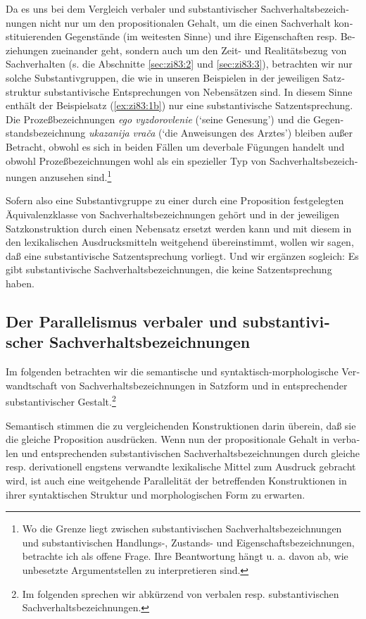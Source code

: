 \documentclass[output=paper]{langscibook}
\begin{document}
\begin{otherlanguage}{german}
Da es uns bei dem Vergleich verbaler und substantivischer Sachverhaltsbezeichnungen nicht nur um den propositionalen Gehalt, um die einen Sachverhalt konstituierenden Gegenstände (im weitesten Sinne) und ihre Eigenschaften resp. Beziehungen zueinander geht, sondern auch um den Zeit- und Realitätsbezug von Sachverhalten (s. die Abschnitte \ref{sec:zi83:2} und \ref{sec:zi83:3}), betrachten wir nur solche Substantivgruppen, die wie in unseren Beispielen in der jeweiligen Satzstruktur substantivische Entsprechungen von Nebensätzen sind. In diesem Sinne enthält der Beispielsatz (\ref{ex:zi83:1b}) nur eine substantivische Satzentsprechung. Die Prozeßbezeichnungen \textit{ego vyzdorovlenie} (‘seine Genesung’) und die Gegenstandsbezeichnung \textit{ukazanija vrača} (‘die Anweisungen des Arztes’) bleiben außer Betracht, obwohl es sich in beiden Fällen um deverbale Fügungen handelt und obwohl Prozeßbezeichnungen wohl als ein spezieller Typ von Sachverhaltsbezeichnungen anzusehen sind.\footnote{Wo die Grenze liegt zwischen substantivischen Sachverhaltsbezeichnungen und substantivischen Handlungs-, Zustands- und Eigenschaftsbezeichnungen, betrachte ich als offene Frage. Ihre Beantwortung hängt u. a. davon ab, wie unbesetzte Argumentstellen zu interpretieren sind.}

Sofern also eine Substantivgruppe zu einer durch eine Proposition festgelegten Äquivalenzklasse von Sachverhaltsbezeichnungen gehört und in der jeweiligen Satzkonstruktion durch einen Nebensatz ersetzt werden kann und mit diesem in den lexikalischen Ausdrucksmitteln weitgehend übereinstimmt, wollen wir sagen, daß eine substantivische Satzentsprechung vorliegt. Und wir ergänzen sogleich: Es gibt substantivische Sachverhaltsbezeichnungen, die keine Satzentsprechung haben.

\subsection{Der Parallelismus verbaler und substantivischer Sachverhaltsbezeichnungen} \label{sec:zi83:1.2}

Im folgenden betrachten wir die semantische und syntaktisch-morphologische Verwandtschaft von Sachverhaltsbezeichnungen in Satzform und in entsprechender substantivischer
Gestalt.\footnote{Im folgenden sprechen wir abkürzend von verbalen resp. substantivischen Sachverhaltsbezeichnungen.}

Semantisch stimmen die zu vergleichenden Konstruktionen darin überein, daß sie die gleiche Proposition ausdrücken. Wenn nun der propositionale Gehalt in verbalen und entsprechenden substantivischen Sachverhaltsbezeichnungen durch gleiche resp. derivationell engstens verwandte lexikalische Mittel zum Ausdruck gebracht wird, ist auch eine weitgehende Parallelität der betreffenden Konstruktionen in ihrer syntaktischen Struktur und morphologischen Form zu erwarten.


\end{otherlanguage}
\end{document}
